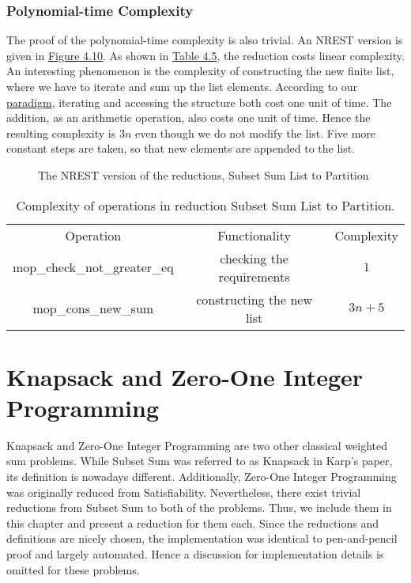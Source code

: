 \subsubsection{Polynomial-time Complexity}
The proof of the polynomial-time complexity is also trivial. 
An NREST version is given in \hyperref[fig:4.10]{Figure 4.10}. 
As shown in \hyperref[table:4.5]{Table 4.5}, the reduction costs linear complexity. 
An interesting phenomenon is the complexity of constructing the new finite list, where we have to iterate and sum up the list elements.
According to our \hyperref[para1]{paradigm}, iterating and accessing the structure both cost one unit of time. 
The addition, as an arithmetic operation, also costs one unit of time.
Hence the resulting complexity is $3n$ even though we do not modify the list.
Five more constant steps are taken, so that new elements are appended to the list.
\begin{figure}[!h]
    \caption{The NREST version of the reductions, Subset Sum List to Partition}
    \label{fig:4.10}
\end{figure}
\begin{table}[!h]
    \centering 
    \begin{tabular}{| c | c | c |}
        \hline 
        Operation & Functionality & Complexity \\ 
        \hhline{|=|=|=|}
        mop\_check\_not\_greater\_eq & checking the requirements & $1$ \\ 
        \hline 
        mop\_cons\_new\_sum & constructing the new list & $3n + 5$ \\ 
        \hline 
    \end{tabular}
    \caption{Complexity of operations in reduction Subset Sum List to Partition.}
    \label{table:4.5}
\end{table}

\section{Knapsack and Zero-One Integer Programming}
Knapsack and Zero-One Integer Programming are two other classical weighted sum problems. While Subset Sum was referred 
to as Knapsack in Karp's paper, its definition is nowadays different. Additionally, Zero-One Integer Programming 
was originally reduced from Satisfiability. Nevertheless, there exist trivial reductions from Subset Sum to both of the problems. Thus, 
we include them in this chapter and present a reduction for them each. 
Since the reductions and definitions are nicely chosen, the implementation was identical to pen-and-pencil proof 
and largely automated. Hence a discussion for implementation details is omitted for these problems.

